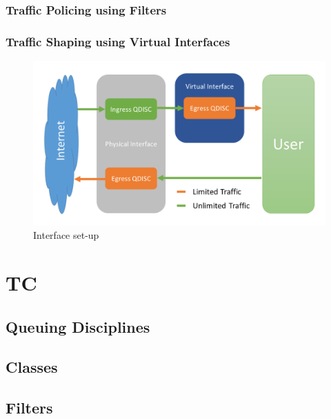 \subsubsection{Traffic Policing using Filters}
\subsubsection{Traffic Shaping using Virtual Interfaces}
\begin{figure}[h]
	\centering
	\includegraphics[width=\textwidth]{img/Interface-Setup.png}
	\caption{Interface set-up}
	\label{Interface set-up}
\end{figure}
\section{TC} \label{TC}
\subsection{Queuing Disciplines}
\subsection{Classes}
\subsection{Filters}